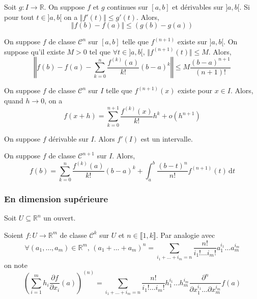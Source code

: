	\begin{theorem}
		Soit $g : I \rightarrow \mathbb{R}$. On suppose $f$ et $g$ continues sur $[a,b]$ et dérivables sur $]a,b[$. Si pour tout $t \in ]a,b[$ on a $\Vert f'(t) \Vert \leq g'(t)$. Alors,
		\[ \Vert f(b) - f(a) \Vert \leq (g(b) - g(a)) \]
	\end{theorem}
	
	\begin{corollary}
		On suppose $f$ de classe $\mathcal{C}^n$ sur $[a,b]$ telle que $f^{(n+1)}$ existe sur $]a,b[$. On suppose qu'il existe $M > 0$ tel que $\forall t \in ]a,b[, \, \Vert f^{(n+1)}(t) \Vert \leq M$. Alors,
		\[ \left\Vert f(b) - f(a) - \sum_{k=0}^{n} \frac{f^{(k)}(a)}{k!}(b-a)^k \right\Vert \leq M \frac{(b-a)^{n+1}}{(n+1)!} \]
	\end{corollary}
	
	\begin{theorem}
		\label{218-2}
		On suppose $f$ de classe $\mathcal{C}^n$ sur $I$ telle que $f^{(n+1)}(x)$ existe pour $x \in I$. Alors, quand $h \longrightarrow 0$, on a
		\[ f(x+h) = \sum_{k=0}^{n+1} \frac{f^{(k)} (x)}{k!} h^k + o(h^{n+1}) \]
	\end{theorem}
	
	
	\begin{application}
		On suppose $f$ dérivable sur $I$. Alors $f'(I)$ est un intervalle.
	\end{application}
	
	
	\begin{theorem}
		On suppose $f$ de classe $\mathcal{C}^{n+1}$ sur $I$. Alors,
		\[ f(b) = \sum_{k=0}^{n} \frac{f^{(k)} (a)}{k!} (b-a)^k + \int_a^b \frac{(b-t)^n}{n!} f^{(n+1)}(t) \, \mathrm{d}t \]
	\end{theorem}
	
	\subsubsection{En dimension supérieure}
	
	
	Soit $U \subseteq \mathbb{R}^n$ un ouvert.
	
	\begin{notation}
		Soient $f : U \rightarrow \mathbb{R}^m$ de classe $\mathcal{C}^k$ sur $U$ et $n \in \llbracket 1, k \rrbracket$. Par analogie avec
		\[ \forall (a_1, \dots, a_m) \in \mathbb{R}^m, \, (a_1 + \dots + a_m)^n = \sum_{i_1+\dots+i_m=n} \frac{n!}{i_1! \dots i_m!} a_1^{i_1} \dots a_m^{i_m} \]
		on note
		\[ \left( \sum_{i=1}^m h_i \frac{\partial f}{\partial x_i} (a) \right)^{(n)} = \sum_{i_1+\dots+i_m=n} \frac{n!}{i_1! \dots i_m!} h_1^{i_1} \dots h_m^{i_m} \frac{\partial^n}{\partial x_1^{i_1} \dots \partial x_m^{i_m}} f(a) \]
	\end{notation}
	
